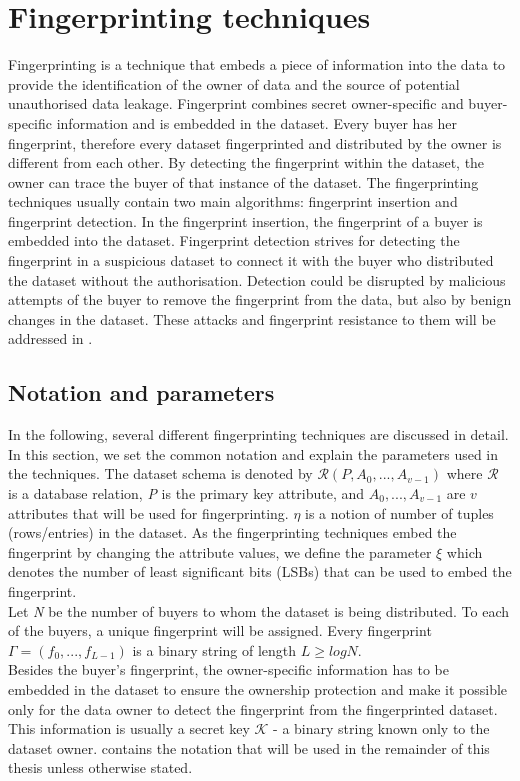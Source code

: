 \chapter{Fingerprinting techniques}\label{sec:Fingerprinting}
Fingerprinting is a technique that embeds a piece of information into the data to provide the identification of the owner of data and the source of potential unauthorised data leakage. 
Fingerprint combines secret owner-specific and buyer-specific information and is embedded in the dataset. 
Every buyer has her fingerprint, therefore every dataset fingerprinted and distributed by the owner is different from each other.
By detecting the fingerprint within the dataset, the owner can trace the buyer of that instance of the dataset. 
The fingerprinting techniques usually contain two main algorithms: fingerprint insertion and fingerprint detection. 
In the fingerprint insertion, the fingerprint of a buyer is embedded into the dataset.
Fingerprint detection strives for detecting the fingerprint in a suspicious dataset to connect it with the buyer who distributed the dataset without the authorisation.
Detection could be disrupted by malicious attempts of the buyer to remove the fingerprint from the data, but also by benign changes in the dataset. 
These attacks and fingerprint resistance to them will be addressed in .


\section{Notation and parameters}
In the following, several different fingerprinting techniques are discussed in detail. 
In this section, we set the common notation and explain the parameters used in the techniques. 
The dataset schema is denoted by $\mathcal{R}(P,A_0,...,A_{v-1})$ where $\mathcal{R}$ is a database relation, \textit{P} is the primary key attribute, and $A_0,...,A_{v-1}$ are $v$ attributes that will be used for fingerprinting. 
$\eta$ is a notion of number of tuples (rows/entries) in the dataset. 
As the fingerprinting techniques embed the fingerprint by changing the attribute values, we define the parameter $\xi$ which denotes the number of least significant bits (LSBs) that can be used to embed the fingerprint. \\
Let \textit{N} be the number of buyers to whom the dataset is being distributed. 
To each of the buyers, a unique fingerprint will be assigned. 
Every fingerprint $\Gamma = (f_0,...,f_{L-1})$ is a binary string of length $L \geq logN$. \\
Besides the buyer's fingerprint, the owner-specific information has to be embedded in the dataset to ensure the ownership protection and make it possible only for the data owner to detect the fingerprint from the fingerprinted dataset. 
This information is usually a secret key $\mathcal{K}$ - a binary string known only to the dataset owner.
 contains the notation that will be used in the remainder of this thesis unless otherwise stated.

